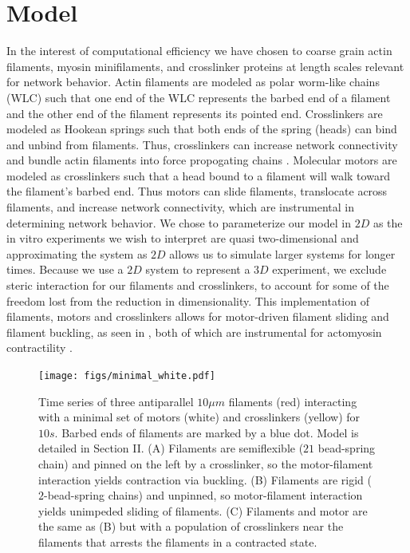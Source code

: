\documentclass[12pt]{article}
\begin{document}
\section{Model}  
In the interest of computational efficiency we have chosen to coarse grain actin filaments, myosin minifilaments, and
crosslinker proteins at length scales relevant for network behavior. Actin filaments are
modeled as polar worm-like chains (WLC) such that one end of the WLC represents the barbed end of a filament and the
other end of the filament represents its pointed end.  
Crosslinkers are modeled as Hookean springs such
that both ends of the spring (heads) can bind and unbind from filaments. Thus, crosslinkers can increase network connectivity
and bundle actin filaments into force propogating chains \cite{gardel2004, murrell2012, murrell2015, murrell2014, freedman2016}. 
Molecular motors are modeled as crosslinkers such
that a head bound to a filament will walk toward the filament's barbed end. Thus motors can slide filaments,
translocate across filaments, and increase network connectivity, which are instrumental in determining
network behavior\cite{murrell2014}. We chose to parameterize our model in $2D$ as the in vitro experiments we wish to
interpret are quasi two-dimensional \cite{murrellTalk} and
approximating the system as $2D$ allows us to simulate larger systems for longer times. Because we use a $2D$ system to
represent a $3D$ experiment, we exclude steric interaction for our filaments and crosslinkers, to account for
some of the freedom lost from the reduction in dimensionality. This implementation of filaments, motors and crosslinkers allows for 
motor-driven filament sliding and filament buckling, as seen in ,
both of which are instrumental for actomyosin contractility \cite{murrell2012}.
\begin{figure}[H]  
  \centering
  \texttt{[image: figs/minimal\_white.pdf]}
  \caption{
  \label{fig:toys}%
  Time series of three antiparallel $10\mu m$ filaments (red) interacting with a
  minimal set of motors (white) and crosslinkers (yellow) for $10s$. Barbed ends
  of filaments are marked by a blue dot. Model is detailed in Section II.   
  (A) Filaments are semiflexible ($21$ bead-spring chain) and pinned on the left
  by a crosslinker, so the motor-filament interaction yields contraction via buckling. 
  (B) Filaments are rigid ($2$-bead-spring chains) and unpinned, so 
  motor-filament interaction yields unimpeded sliding of filaments.
  (C) Filaments and motor are the same as (B) but with a population of
crosslinkers near the filaments that arrests the filaments in a contracted state. } 
\end{figure}
\end{document}
